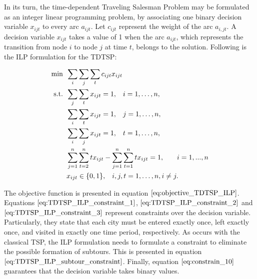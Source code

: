 
In its turn, the time-dependent Traveling Salesman Problem may be formulated as an integer linear programming problem, by associating one binary decision variable $x_{ijt}$ to every arc $a_{ijt}$. Let $c_{ijt}$ represent the weight of the arc $a_{i,jt}$. A decision variable $x_{ijt}$ takes a value of 1 when the arc $a_{ijt}$, which represents the transition from node $i$ to node $j$ at time $t$, belongs to the solution. Following is the ILP formulation for the TDTSP:

\begin{align}
  \min  &\hspace{0.5em} \sum_{i}\sum_{j}\sum_{t} c_{ijt}x_{ijt} \label{eq:objective_TDTSP_ILP} \\
  \mathrm{s.t.}   &\hspace{0.5em} \sum_{j}\sum_{t}x_{ijt} = 1 , \hspace{3mm} i = 1, \ldots, n, \label{eq:TDTSP_ILP_constraint_1}\\
  & \hspace{0.5em} \sum_{i}\sum_{t}x_{ijt} = 1, \hspace{3mm} j = 1, \ldots, n, \label{eq:TDTSP_ILP_constraint_2}\\
    & \hspace{0.5em} \sum_{i}\sum_{j}x_{ijt} = 1, \hspace{3mm} t = 1, \ldots, n, \label{eq:TDTSP_ILP_constraint_3}\\
  & \hspace{0.5em} \sum_{j = 1}^{n}\sum_{t=2}^{n}tx_{ijt} - \sum_{j = 1}^{n}\sum_{t=1}^{n}tx_{ijt}  = 1, \hspace{3mm} \quad i = 1, ... ,n \label{eq:TDTSP_ILP_constraint_4}\\
  & \hspace{0.5em} x_{ijt} \in \{0, 1\}, \hspace{3mm} i, j, t = 1, \ldots, n, i \ne j. \label{eq:TDTSP_ILP_constraint_5}
\end{align}

The objective function is presented in equation $\ref{eq:objective_TDTSP_ILP}$. Equations $\ref{eq:TDTSP_ILP_constraint_1}$, $\ref{eq:TDTSP_ILP_constraint_2}$ and $\ref{eq:TDTSP_ILP_constraint_3}$ represent constraints over the decision variable. Particularly, they state that each city must be entered exactly once, left exactly once, and visited in exactly one time period, respectively. As occurs with the classical TSP, the ILP formulation needs to formulate a constraint to eliminate the possible formation of subtours. This is presented in equation $\ref{eq:TDTSP_ILP_subtour_constraint}$. Finally, equation $\ref{eq:constrain_10}$ guarantees that the decision variable takes binary values.
